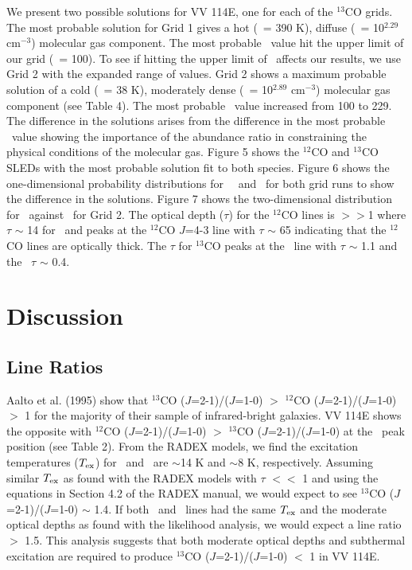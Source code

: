 We present two possible solutions for VV 114E, one for each of the $^{13}$CO grids. The most probable solution for Grid 1 gives a hot (\tkin\ = 390 K), diffuse (\nhtwo\ = 10$^{2.29}$ cm$^{-3}$) molecular gas component. The most probable \xco\ value hit the upper limit of our grid (\xco\ = 100). To see if hitting the upper limit of \xco\ affects our results, we use Grid 2 with the expanded range of values. Grid 2 shows a maximum probable solution of a cold (\tkin\ = 38 K), moderately dense (\nhtwo\ =  10$^{2.89}$ cm$^{-3}$) molecular gas component (see Table 4). The most probable \xco\ value increased from 100 to 229. The difference in the solutions arises from the difference in the most probable \xco\ value showing the importance of the abundance ratio in constraining the physical conditions of the molecular gas. Figure 5 shows the $^{12}$CO and $^{13}$CO SLEDs with the most probable solution fit to both species. Figure 6 shows the one-dimensional probability distributions for \tkin\, \nhtwo\ and \nco\ for both grid runs to show the difference in the solutions. Figure 7 shows the two-dimensional distribution for \tkin\ against \nhtwo\ for Grid 2. The optical depth ($\tau$) for the $^{12}$CO lines is $>>$1 where $\tau$ $\sim$ 14 for \coone\ and peaks at the $^{12}$CO $J$=4-3 line with $\tau$ $\sim$ 65 indicating that the $^{12}$CO lines are optically thick. The $\tau$ for $^{13}$CO peaks at the \tcotwo\ line with $\tau$ $\sim$ 1.1 and the \tcoone\ $\tau$ $\sim$ 0.4.

\section{Discussion}%
\subsection{Line Ratios}%
Aalto et al. (1995)\nocite{1995A&A...300..369A} show that $^{13}$CO ($J$=2-1)/($J$=1-0) $>$ $^{12}$CO ($J$=2-1)/($J$=1-0) $>$ 1 for the majority of their sample of infrared-bright galaxies. VV 114E shows the opposite with $^{12}$CO ($J$=2-1)/($J$=1-0) $>$ $^{13}$CO ($J$=2-1)/($J$=1-0) at the \cothree\ peak position (see Table 2).  From the RADEX models, we find the excitation temperatures ($T_{\rm{ex}}$) for \tcoone\ and \tcotwo\ are $\sim$14 K and $\sim$8 K, respectively. Assuming similar $T_{\rm{ex}}$ as found with the RADEX models with $\tau$ $<<$ 1 and using the equations in Section 4.2 of the RADEX manual\footnotemark{}, we would expect to see $^{13}$CO ($J$=2-1)/($J$=1-0) $\sim$ 1.4. If both \tcoone\ and \tcotwo\ lines had the same $T_{\rm{ex}}$ and the moderate optical depths as found with the likelihood analysis, we would expect a line ratio $>$ 1.5. This analysis suggests that both moderate optical depths and subthermal excitation are required to produce $^{13}$CO ($J$=2-1)/($J$=1-0) $<$ 1 in VV 114E.

